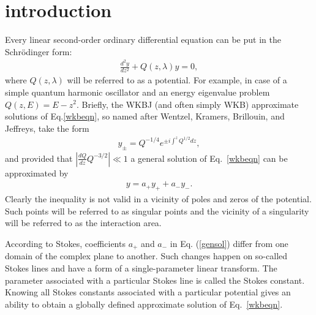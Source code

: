\documentclass[aps,prl,preprint,superscriptaddress]{revtex4}
\begin{document}
\pacs{}

\maketitle

\section{introduction \label{intro}}
Every linear second-order ordinary differential equation can be put in the Schr\"odinger form:
\begin{eqnarray}
\frac{d^2y}{dz^2} + Q(z,\lambda)y = 0,   \label{wkbeqn}
\end{eqnarray}
where \mbox{$Q(z,\lambda)$} will be referred to as a potential. For example, in case of a simple quantum harmonic oscillator and an energy eigenvalue problem \mbox{$Q(z,E)=E-z^2$}. Briefly, the WKBJ (and often simply WKB) 
approximate solutions of Eq.\ref{wkbeqn}, so named after
Wentzel, Kramers, Brillouin, and Jeffreys\cite{wkbj}, take the form
\begin{eqnarray}
y_\pm = Q^{-1/4} e^{\pm i \int^z Q^{1/2} dz},   \label{wkbsol}
\end{eqnarray}
and provided that
$\left|\frac{dQ}{dz}Q^{-3/2}\right| \ll 1 $
a general solution of Eq.~\ref{wkbeqn} can be approximated by
\begin{eqnarray}
y = a_+y_+ + a_-y_-.    \label{gensol}
\end{eqnarray}
Clearly the inequality is not valid in a vicinity of poles and zeros of the potential. Such points will be referred to as singular points and the vicinity of a singularity will be referred to as the interaction area.

According to Stokes\cite{stokes}, coefficients $a_+$ and $a_-$ in Eq. (\ref{gensol}) differ from one domain of the complex plane to another. Such changes happen on so-called Stokes lines and have a form of a single-parameter linear transform\cite{heading}. The parameter associated with a particular Stokes line is called the Stokes constant. Knowing all Stokes constants associated with a particular potential gives an ability to obtain a globally defined approximate solution of Eq.~\ref{wkbeqn}\cite{heading,rwbook}.
\end{document}
